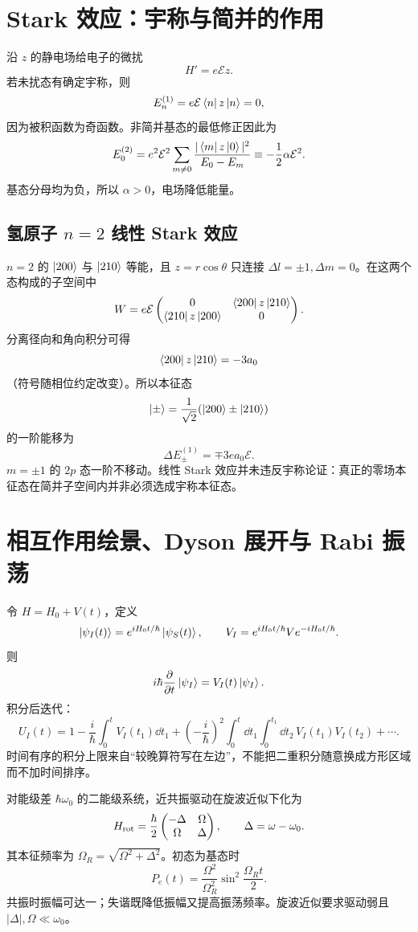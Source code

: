 \section{Stark 效应：宇称与简并的作用}
沿 $z$ 的静电场给电子的微扰
\[
H'=e\mathcal E z.
\]
若未扰态有确定宇称，则
\[
E_n^{(1)}=e\mathcal E\left\langle n\right| z\left|n\right\rangle=0,
\]
因为被积函数为奇函数。非简并基态的最低修正因此为
\[
E_0^{(2)}
=e^2\mathcal E^2\sum_{m\ne0}
\frac{|\left\langle m\right| z\left|0\right\rangle|^2}{E_0-E_m}
\equiv-\frac12\alpha\mathcal E^2.
\]
基态分母均为负，所以 $\alpha>0$，电场降低能量。

\subsection{氢原子 $n=2$ 线性 Stark 效应}
$n=2$ 的 $\left|200\right\rangle$ 与 $\left|210\right\rangle$ 等能，且 $z=r\cos\theta$ 只连接
$\Delta l=\pm1,\Delta m=0$。在这两个态构成的子空间中
\[
W=e\mathcal E
\begin{pmatrix}0&\left\langle200\right|z\left|210\right\rangle\\
\left\langle210\right|z\left|200\right\rangle&0\end{pmatrix}.
\]
分离径向和角向积分可得
\[
\left\langle200\right|z\left|210\right\rangle=-3a_0
\]
（符号随相位约定改变）。所以本征态
\[
\left|\pm\right\rangle=\frac1{\sqrt2}(\left|200\right\rangle\pm\left|210\right\rangle)
\]
的一阶能移为
\[
\boxed{\Delta E_\pm^{(1)}=\mp3ea_0\mathcal E}.
\]
$m=\pm1$ 的 $2p$ 态一阶不移动。线性 Stark 效应并未违反宇称论证：真正的零场本征态在简并子空间内并非必须选成宇称本征态。

\section{相互作用绘景、Dyson 展开与 Rabi 振荡}
令 $H=H_0+V(t)$，定义
\[
\left|\psi_I(t)\right\rangle=e^{iH_0t/\hbar}\left|\psi_S(t)\right\rangle,\qquad
V_I=e^{iH_0t/\hbar}Ve^{-iH_0t/\hbar}.
\]
则
\[
i\hbar\frac{\partial }{\partial t}\left|\psi_I\right\rangle=V_I(t)\left|\psi_I\right\rangle.
\]
积分后迭代：
\[
U_I(t)=1-\frac{i}{\hbar}\int_0^tV_I(t_1)\dd t_1
+\left(-\frac{i}{\hbar}\right)^2
\int_0^t\dd t_1\int_0^{t_1}\dd t_2\,V_I(t_1)V_I(t_2)+\cdots.
\]
时间有序的积分上限来自“较晚算符写在左边”，不能把二重积分随意换成方形区域而不加时间排序。

对能级差 $\hbar\omega_0$ 的二能级系统，近共振驱动在旋波近似下化为
\[
H_{\rm rot}=\frac{\hbar}{2}
\begin{pmatrix}-\Delta&\Omega\\ \Omega&\Delta\end{pmatrix},
\qquad \Delta=\omega-\omega_0.
\]
其本征频率为 $\Omega_R=\sqrt{\Omega^2+\Delta^2}$。初态为基态时
\[
P_e(t)=\frac{\Omega^2}{\Omega_R^2}
\sin^2\frac{\Omega_Rt}{2}.
\]
共振时振幅可达一；失谐既降低振幅又提高振荡频率。旋波近似要求驱动弱且
$|\Delta|,\Omega\ll\omega_0$。

